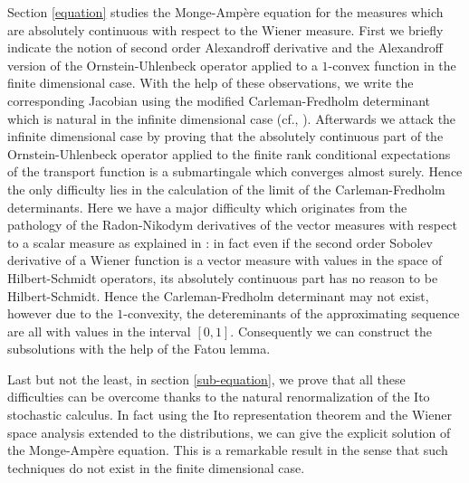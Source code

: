 \documentclass[12pt,a4paper]{book}
\begin{document}
Section \ref{equation} studies the Monge-Amp\`ere equation for the
measures which are absolutely continuous with respect to the Wiener
measure. First we briefly indicate the notion of  second order
Alexandroff derivative   and the Alexandroff version of the
Ornstein-Uhlenbeck operator applied to a $1$-convex function   in the
finite dimensional case. With the help of these observations, we write the
corresponding Jacobian using the modified Carleman-Fredholm
determinant which is natural in the infinite dimensional case (cf.,
\cite{UZ7}). Afterwards we attack the infinite dimensional case by
proving that the absolutely continuous part of the Ornstein-Uhlenbeck
operator applied to the finite rank conditional expectations of the
transport function is a submartingale which converges almost
surely. Hence the only difficulty lies in the calculation of the limit
of the Carleman-Fredholm determinants. Here we have a major difficulty
which originates from the pathology  of the
Radon-Nikodym derivatives of the vector measures with respect to a
scalar measure as explained in \cite{THOMAS}: in fact even if the
second order Sobolev  derivative of a Wiener function is a vector
measure with values in the space of Hilbert-Schmidt operators, its
absolutely continuous part has no reason to be Hilbert-Schmidt. Hence
the Carleman-Fredholm determinant may not exist, however 
due  to the $1$-convexity, the detereminants of the approximating
sequence are all with values in the interval $[0,1]$. Consequently  we
can construct the subsolutions with the help of the  Fatou lemma. 

Last but not the least, in section \ref{sub-equation}, we prove that
all these difficulties can be overcome thanks to the natural
renormalization of the Ito stochastic calculus. In fact using the Ito
representation theorem and the Wiener space analysis extended to the
distributions,  we can give the explicit solution of the
Monge-Amp\`ere equation. This is a remarkable result in the sense that
such techniques do not exist in the finite dimensional case.









\end{document}
